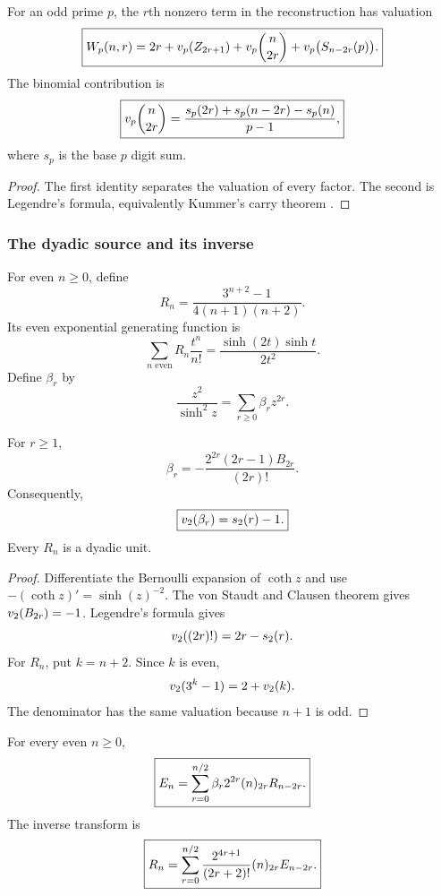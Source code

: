 \begin{histproposition}\label{hist:prop:odd_row_weight}
For an odd prime \(p\), the \(r\)th nonzero term in the reconstruction has valuation
\[
\boxed{
W_p(n,r)
=
2r+v_p(Z_{2r+1})
+v_p\binom n{2r}
+v_p\bigl(S_{n-2r}(p)\bigr).
}
\]
The binomial contribution is
\[
\boxed{
v_p\binom n{2r}
=
\frac{s_p(2r)+s_p(n-2r)-s_p(n)}{p-1},
}
\]
where \(s_p\) is the base \(p\) digit sum.
\end{histproposition}

\begin{proof}
The first identity separates the valuation of every factor. The second is Legendre's formula, equivalently Kummer's carry theorem \cite{IrelandRosen1990}.
\end{proof}

\subsubsection{The dyadic source and its inverse}

For even \(n\geq0\), define
\[
\boxed{
R_n
=
\frac{3^{n+2}-1}{4(n+1)(n+2)}.
}
\]
Its even exponential generating function is
\[
\boxed{
\sum_{n\text{ even}}R_n\frac{t^n}{n!}
=
\frac{\sinh(2t)\sinh t}{2t^2}.
}
\]
Define \(\beta_r\) by
\[
\boxed{
\frac{z^2}{\sinh^2z}
=
\sum_{r\geq0}\beta_rz^{2r}.
}
\]

\begin{histproposition}\label{hist:prop:dyadic_beta_unified}
For \(r\geq1\),
\[
\boxed{
\beta_r
=
-
\frac{2^{2r}(2r-1)B_{2r}}{(2r)!}.
}
\]
Consequently,
\[
\boxed{
v_2(\beta_r)=s_2(r)-1.
}
\]
Every \(R_n\) is a dyadic unit.
\end{histproposition}

\begin{proof}
Differentiate the Bernoulli expansion of \(\coth z\) and use \(-(\coth z)'=\sinh(z)^{-2}\). The von Staudt and Clausen theorem gives \(v_2(B_{2r})=-1\). Legendre's formula gives
\[
v_2((2r)!)=2r-s_2(r).
\]
For \(R_n\), put \(k=n+2\). Since \(k\) is even,
\[
v_2(3^k-1)=2+v_2(k).
\]
The denominator has the same valuation because \(n+1\) is odd.
\end{proof}

\begin{histtheorem}\label{hist:thm:dyadic_coordinate_pair}
For every even \(n\geq0\),
\[
\boxed{
E_n
=
\sum_{r=0}^{n/2}
\beta_r2^{2r}
(n)_{2r}
R_{n-2r}.
}
\]
The inverse transform is
\[
\boxed{
R_n
=
\sum_{r=0}^{n/2}
\frac{2^{4r+1}}{(2r+2)!}
(n)_{2r}
E_{n-2r}.
}
\]
\end{histtheorem}

